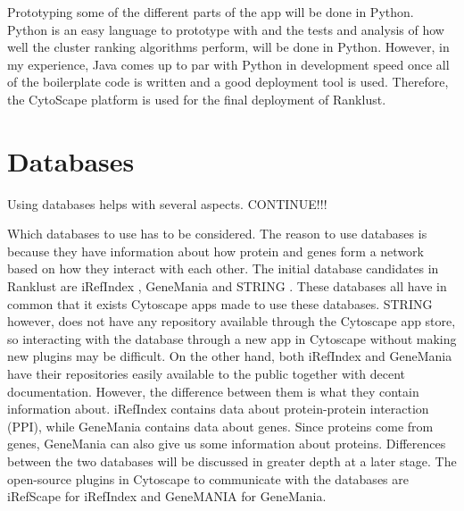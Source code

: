 Prototyping some of the different parts of the app will be done in Python. Python is an
easy language to prototype with and the tests and analysis of how well the
cluster ranking algorithms perform, will be done in Python. However, in my
experience, Java comes up to par with Python in development speed once all of
the boilerplate code is written and a good deployment tool is used. Therefore,
the CytoScape platform is used for the final deployment of Ranklust. 

\chapter{Databases}
Using databases helps with several aspects. CONTINUE!!!

Which databases to use has to be considered. The reason to use databases is
because they have information about how protein and genes form a network based
on how they interact with each other. The initial database candidates in
Ranklust are iRefIndex \cite{iri}, GeneMania \cite{gm} and STRING \cite{str}.
These databases all have in common that it exists Cytoscape apps made to use
these databases. STRING however, does not have any repository available through
the Cytoscape app store, so interacting with the database through a new app in
Cytoscape without making new plugins may be difficult.  On the other hand, both
iRefIndex and GeneMania have their repositories easily available to the public
together with decent documentation. However, the difference between them is what
they contain information about. iRefIndex contains data about protein-protein
interaction (PPI), while GeneMania contains data about genes.
Since proteins come from genes, GeneMania can also give us some information
about proteins. Differences between the two databases will be discussed in
greater depth at a later stage.  The open-source plugins in Cytoscape to
communicate with the databases are iRefScape \cite{iridb} for iRefIndex and
GeneMANIA \cite{gmdb} for GeneMania.

